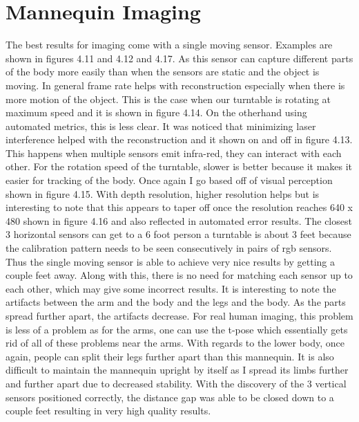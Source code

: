 \section{Mannequin Imaging}
The best results for imaging come with a single moving sensor. Examples are shown in figures 4.11 and 4.12 and 4.17. As this sensor can capture different parts of the body more easily than when the sensors are static and the object is moving. In general frame rate helps with reconstruction especially when there is more motion of the object. This is the case when our turntable is rotating at maximum speed and it is shown in figure 4.14. On the otherhand using automated metrics, this is less clear. It was noticed that minimizing laser interference helped with the reconstruction and it shown on and off in figure 4.13. This happens when multiple sensors emit infra-red, they can interact with each other. For the rotation speed of the turntable, slower is better because it makes it easier for tracking of the body. Once again I go based off of visual perception shown in figure 4.15. With depth resolution, higher resolution helps but is interesting to note that this appears to taper off once the resolution reaches 640 x 480 shown in figure 4.16 and also reflected in automated error results. The closest 3 horizontal sensors can get to a 6 foot person a turntable is about 3 feet because the calibration pattern needs to be seen consecutively in pairs of rgb sensors. Thus the single moving sensor is able to achieve very nice results by getting a couple feet away. Along with this, there is no need for matching each sensor up to each other, which may give some incorrect results. It is interesting to note the artifacts between the arm and the body and the legs and the body. As the parts spread further apart, the artifacts decrease. For real human imaging, this problem is less of a problem as for the arms, one can use the t-pose which essentially gets rid of all of these problems near the arms. With regards to the lower body, once again, people can split their legs further apart than this mannequin. It is also difficult to maintain the mannequin upright by itself as I spread its limbs further and further apart due to decreased stability. With the discovery of the 3 vertical sensors positioned correctly, the distance gap was able to be closed down to a couple feet resulting in very high quality results.

